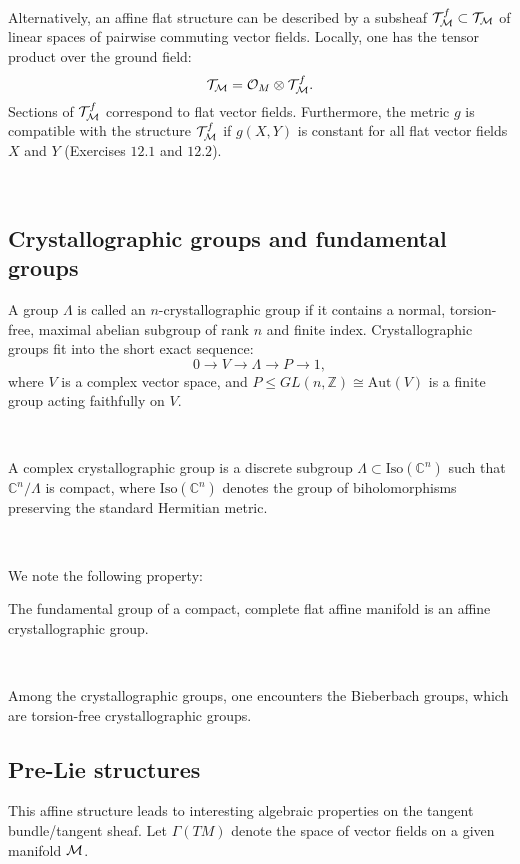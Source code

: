 \,
\subsubsection{}
Alternatively, an affine flat structure can be described by a subsheaf $\mathcal{T}_{\mathcal{M}}^f \subset \mathcal{T}_{\mathcal{M}}$ of linear spaces of pairwise commuting vector fields. Locally, one has the tensor product over the ground field:
\[
\mathcal{T}_{\mathcal{M}} = \mathcal{O}_M \otimes \mathcal{T}_{\mathcal{M}}^f.
\]
Sections of $\mathcal{T}_{\mathcal{M}}^f$ correspond to flat vector fields. Furthermore, the metric $g$ is compatible with the structure $\mathcal{T}_{\mathcal{M}}^f$ if $g(X, Y)$ is constant for all flat vector fields $X$ and $Y$ (Exercises $12.1$ and $12.2$).

\,
\subsection{Crystallographic groups and fundamental groups}
A group $\Lambda$ is called an $n$-crystallographic group if it contains a normal, torsion-free, maximal abelian subgroup of rank $n$ and finite index. Crystallographic groups fit into the short exact sequence:
\[
0 \to V \to \Lambda \to P \to 1,
\]
where $V$ is a complex vector space, and $P \leq GL(n, \mathbb{Z}) \cong \mathrm{Aut}(V)$ is a finite group acting faithfully on $V$.

\,

A complex crystallographic group is a discrete subgroup $\Lambda \subset \mathrm{Iso}(\mathbb{C}^n)$ such that $\mathbb{C}^n / \Lambda$ is compact, where $\mathrm{Iso}(\mathbb{C}^n)$ denotes the group of biholomorphisms preserving the standard Hermitian metric.

\,

We note the following property:
\begin{lemma}
The fundamental group of a compact, complete flat affine manifold is an affine crystallographic group.
\end{lemma}

\,

Among the crystallographic groups, one encounters the Bieberbach groups, which are torsion-free crystallographic groups.
\

\subsection{Pre-Lie structures}
This affine structure leads to interesting algebraic properties on the tangent bundle/tangent sheaf. Let $\Gamma(TM)$ denote the space of vector fields on a given manifold $\mathcal{M}$.

